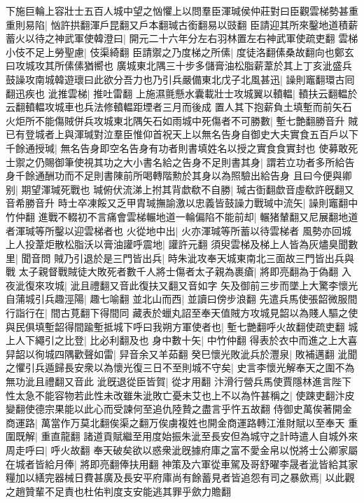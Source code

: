 下施巨輪上容壯士五百人城中望之忷懼上以問羣臣渾瑊侯仲莊對曰臣觀雲梯勢甚重重則易陷|{
	忷許拱翻渾戶昆翻又戶本翻瑊古銜翻易以豉翻}
臣請迎其所來鑿地道積薪蓄火以待之神武軍使韓澄曰|{
	開元二十六年分左右羽林置左右神武軍使疏吏翻}
雲梯小伎不足上勞聖慮|{
	伎渠綺翻}
臣請禦之乃度梯之所傃|{
	度徒洛翻傃桑故翻向也鄭玄曰攻城攻其所傃傃猶嚮也}
廣城東北隅三十步多儲膏油松脂薪葦於其上丁亥泚盛兵鼓譟攻南城韓遊瓌曰此欲分吾力也乃引兵嚴備東北戊子北風甚迅|{
	譟則竈翻環古囘翻迅疾也}
泚推雲梯|{
	推吐雷翻}
上施濕氈懸水囊載壯士攻城翼以轒輼|{
	轒扶云翻輼於云翻轒輼攻城車也兵法修轒輼距堙者三月而後成}
置人其下抱薪負土填塹而前矢石火炬所不能傷賊併兵攻城東北隅矢石如雨城中死傷者不可勝數|{
	塹七艶翻勝音升}
賊已有登城者上與渾瑊對泣羣臣惟仰首祝天上以無名告身自御史大夫實食五百戶以下千餘通授瑊|{
	無名告身即空名告身有功者則書填姓名以授之實食食實封也}
使募敢死士禦之仍賜御筆使視其功之大小書名給之告身不足則書其身|{
	謂若立功者多所給告身千餘通酬功而不足則書陳前所喝轉階勲於其身以為照驗出給告身}
且曰今便與卿别|{
	期望渾瑊死戰也}
瑊俯伏流涕上拊其背歔欷不自勝|{
	瑊古衘翻歔音虛欷許旣翻又音希勝音升}
時士卒凍餒又乏甲胄瑊撫諭激以忠義皆鼓譟力戰瑊中流矢|{
	譟則竈翻中竹仲翻}
進戰不輟初不言痛會雲梯輾地道一輪偏陷不能前却|{
	輾猪輦翻又尼展翻地道者渾瑊等所鑿以迎雲梯者也}
火從地中出|{
	火亦渾瑊等所蓄以待雲梯者}
風勢亦回城上人投葦炬散松脂沃以膏油讙呼震地|{
	讙許元翻}
須臾雲梯及梯上人皆為灰燼臭聞數里|{
	聞音問}
賊乃引退於是三門皆出兵|{
	時朱泚攻奉天城東南北三面故三門皆出兵與戰}
太子親督戰賊徒大敗死者數千人將士傷者太子親為裹瘡|{
	將即亮翻為于偽翻}
入夜泚復來攻城|{
	泚且禮翻又音此復扶又翻又音如字}
矢及御前三步而墜上大驚李懷光自蒲城引兵趣涇陽|{
	趣七喻翻}
並北山而西|{
	並讀曰傍步浪翻}
先遣兵馬使張韶微服間行詣行在|{
	間古莧翻下得間同}
藏表於蠟丸詔至奉天值賊方攻城見韶以為賤人驅之使與民俱填塹韶得間踰塹抵城下呼曰我朔方軍使者也|{
	塹七艷翻呼火故翻使疏吏翻}
城上人下繩引之比登|{
	比必利翻及也}
身中數十矢|{
	中竹仲翻}
得表於衣中而進之上大喜舁韶以徇城四隅歡聲如雷|{
	舁音余又羊茹翻}
癸巳懷光敗泚兵於灃泉|{
	敗補邁翻}
泚聞之懼引兵遁歸長安衆以為懷光復三日不至則城不守矣|{
	史言李懷光解奉天之圍不為無功泚且禮翻又音此}
泚旣退從臣皆賀|{
	從才用翻}
汴滑行營兵馬使賈隱林進言陛下性太急不能容物若此性未改雖朱泚敗亡憂未艾也上不以為忤甚稱之|{
	使踈吏翻汴皮變翻使德宗果能以此心而受諫何至追仇陸贄之盡言乎忤五故翻}
侍御史萬俟著開金商運路|{
	萬當作万莫北翻俟渠之翻万俟虜複姓也開金商運路轉江淮財賦以至奉天}
重圍既解|{
	重直龍翻}
諸道貢賦繼至用度始振朱泚至長安但為城守之計時遣人自城外來周走呼曰|{
	呼火故翻}
奉天破矣欲以惑衆泚旣據府庫之富不愛金帛以悦將士公卿家屬在城者皆給月俸|{
	將即亮翻俸扶用翻}
神策及六軍從車駕及哥舒曜李晟者泚皆給其家糧加以繕完器械日費甚廣及長安平府庫尚有餘蓄見者皆追怨有司之暴歛焉|{
	以此觀之趙贊輩不足責也杜佑判度支安能逃其罪乎歛力贍翻}
